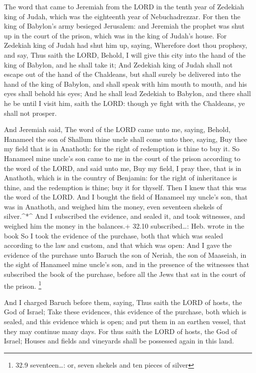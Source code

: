  The word that came to Jeremiah from the LORD in the tenth
year of Zedekiah king of Judah, which was the eighteenth year of
Nebuchadrezzar.  For then the king of Babylon's army
besieged Jerusalem: and Jeremiah the prophet was shut up in the court of
the prison, which was in the king of Judah's house.  For
Zedekiah king of Judah had shut him up, saying, Wherefore dost thou
prophesy, and say, Thus saith the LORD, Behold, I will give this city
into the hand of the king of Babylon, and he shall take it; 
And Zedekiah king of Judah shall not escape out of the hand of the
Chaldeans, but shall surely be delivered into the hand of the king of
Babylon, and shall speak with him mouth to mouth, and his eyes shall
behold his eyes;  And he shall lead Zedekiah to Babylon, and
there shall he be until I visit him, saith the LORD: though ye fight
with the Chaldeans, ye shall not prosper.

 And Jeremiah said, The word of the LORD came unto me,
saying,  Behold, Hanameel the son of Shallum thine uncle
shall come unto thee, saying, Buy thee my field that is in Anathoth: for
the right of redemption is thine to buy it.  So Hanameel
mine uncle's son came to me in the court of the prison according to the
word of the LORD, and said unto me, Buy my field, I pray thee, that is
in Anathoth, which is in the country of Benjamin: for the right of
inheritance is thine, and the redemption is thine; buy it for thyself.
Then I knew that this was the word of the LORD.  And I
bought the field of Hanameel my uncle's son, that was in Anathoth, and
weighed him the money, even seventeen shekels of silver.\^{}*\^{}
 And I subscribed the evidence, and sealed it, and took
witnesses, and weighed him the money in the balances.+ 32.10
subscribed\ldots: Heb. wrote in the book  So I took the
evidence of the purchase, both that which was sealed according to the
law and custom, and that which was open:  And I gave the
evidence of the purchase unto Baruch the son of Neriah, the son of
Maaseiah, in the sight of Hanameel mine uncle's son, and in the presence
of the witnesses that subscribed the book of the purchase, before all
the Jews that sat in the court of the prison. \footnote{32.9
  seventeen\ldots: or, seven shekels and ten pieces of silver}

 And I charged Baruch before them, saying, 
Thus saith the LORD of hosts, the God of Israel; Take these evidences,
this evidence of the purchase, both which is sealed, and this evidence
which is open; and put them in an earthen vessel, that they may continue
many days.  For thus saith the LORD of hosts, the God of
Israel; Houses and fields and vineyards shall be possessed again in this
land.

